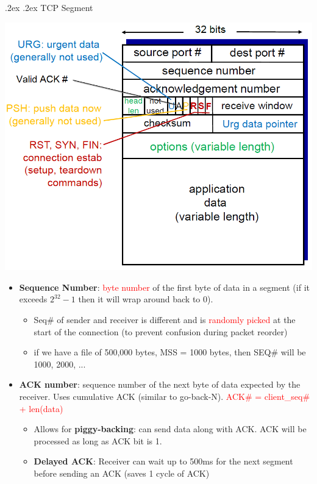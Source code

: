 \documentclass[10pt,landscape,a4paper]{article}
\makeatletter
\renewcommand{\subsection}{\@startsection{subsection}{1}{0mm}%
    {.2ex}%
    {.2ex}%
    {\sffamily\bfseries}}
\makeatother
\begin{document}
\begin{multicols*}{4}
        \subsection{TCP Segment}
        \begin{center}
            \includegraphics[width=0.7\columnwidth]{tcp_segment}
        \end{center}
        \begin{itemize}
            \item \textbf{Sequence Number}: \textcolor{red}{byte number} of the first byte of data in a segment (if it exceeds $2^{32} - 1$ then it will wrap around back to 0).
            \begin{itemize}
                \item Seq\# of sender and receiver is different and is \textcolor{red}{randomly picked} at the start of the connection (to prevent confusion during packet reorder)
                \item if we have a file of 500,000 bytes, MSS = 1000 bytes, then SEQ\# will be 1000, 2000, ...
            \end{itemize}
            \item \textbf{ACK number}: sequence number of the next byte of data expected by the receiver. Uses cumulative ACK (similar to go-back-N). \textcolor{red}{ACK\# = client\_seq\# + len(data)}
            \begin{itemize}
                \item Allows for \textbf{piggy-backing}: can send data along with ACK. ACK will be processed as long as ACK bit is 1.
                \item \textbf{Delayed ACK}: Receiver can wait up to 500ms for the next segment before sending an ACK (saves 1 cycle of ACK)
            \end{itemize}

\end{itemize}
\end{multicols*}
\end{document}
